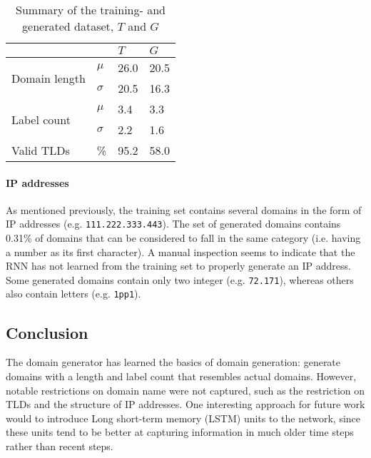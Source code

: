 \begin{table}[t]
\centering
\caption{Summary of the training- and generated dataset, $T$ and $G$}
\label{tab:statistics}
\begin{tabular}{@{}llp{1cm}p{1cm}@{}}
\toprule
              &                         & $T$  & $G$  \\ \midrule
\multirow{2}{*}{Domain length} & $\mu$                   & 26.0 & 20.5 \\ 
              & $\sigma$ & 20.5 & 16.3 \\ \midrule
\multirow{2}{*}{Label count}   & $\mu$                   & 3.4  & 3.3  \\ 
              & $\sigma$                & 2.2  & 1.6  \\ \midrule
Valid TLDs    & \%                      & 95.2 & 58.0 \\ \bottomrule
\end{tabular}
\end{table}

\paragraph{IP addresses}
As mentioned previously, the training set contains several domains in the form of IP addresses (e.g. {\tt 111.222.333.443}).
The set of generated domains contains 0.31\% of domains that can be considered to fall in the same category (i.e. having a number as its first character).
A manual inspection seems to indicate that the RNN has not learned from the training set to properly generate an IP address.
Some generated domains contain only two integer (e.g. {\tt 72.171}), whereas others also contain letters (e.g. {\tt 1pp1}).

\subsection{Conclusion}
The domain generator has learned the basics of domain generation: generate domains with a length and label count that resembles actual domains.
However, notable restrictions on domain name were not captured, such as the restriction on TLDs and the structure of IP addresses.
One interesting approach for future work would to introduce Long short-term memory (LSTM) units to the network, since these units tend to be better at capturing information in much older time steps rather than recent steps.